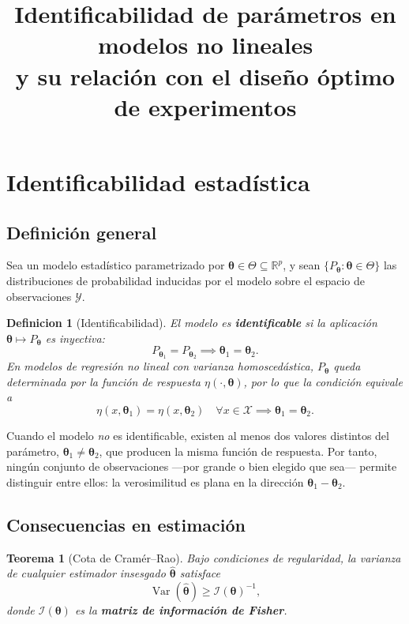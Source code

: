 \documentclass[11pt, a4paper]{article}
\title{Identificabilidad de par\'ametros en modelos no lineales\\
       y su relaci\'on con el dise\~no \'optimo de experimentos}
\author{}
\date{}
\newtheorem{definition}{Definicion}
\newtheorem{theorem}{Teorema}
\DeclareMathOperator{\Var}{Var}
\newcommand{\R}{\mathbb{R}}
\newcommand{\btheta}{\boldsymbol{\theta}}
\begin{document}
\maketitle
\tableofcontents
\bigskip

\section{Identificabilidad estad\'istica}

\subsection{Definici\'on general}

Sea un modelo estad\'istico parametrizado por $\btheta \in \Theta \subseteq \R^p$, y sean
$\{P_{\btheta} : \btheta \in \Theta\}$ las distribuciones de probabilidad inducidas por el
modelo sobre el espacio de observaciones $\mathcal{Y}$.

\begin{definition}[Identificabilidad]
El modelo es \textbf{identificable} si la aplicaci\'on $\btheta \mapsto P_{\btheta}$ es
inyectiva:
\[
  P_{\btheta_1} = P_{\btheta_2} \implies \btheta_1 = \btheta_2.
\]
En modelos de regresi\'on no lineal con varianza homoscedástica, $P_{\btheta}$ queda
determinada por la funci\'on de respuesta $\eta(\cdot,\btheta)$, por lo que la condici\'on
equivale a
\[
  \eta(x, \btheta_1) = \eta(x, \btheta_2) \quad \forall x \in \mathcal{X}
  \implies \btheta_1 = \btheta_2.
\]
\end{definition}

Cuando el modelo \emph{no} es identificable, existen al menos dos valores distintos del
par\'ametro, $\btheta_1 \neq \btheta_2$, que producen la misma funci\'on de respuesta.
Por tanto, ning\'un conjunto de observaciones ---por grande o bien elegido que sea--- permite
distinguir entre ellos: la verosimilitud es plana en la direcci\'on $\btheta_1 - \btheta_2$.

\subsection{Consecuencias en estimaci\'on}

\begin{theorem}[Cota de Cram\'er--Rao]
Bajo condiciones de regularidad, la varianza de cualquier estimador insesgado $\hat{\btheta}$
satisface
\[
  \Var(\hat{\btheta}) \geq \mathcal{I}(\btheta)^{-1},
\]
donde $\mathcal{I}(\btheta)$ es la \textbf{matriz de informaci\'on de Fisher}.
\end{theorem}
\end{document}
